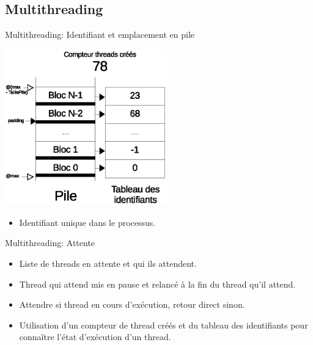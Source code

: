 \documentclass{beamer}
\begin{document}
\subsection{Multithreading}
\begin{frame}{Multithreading: Identifiant et emplacement en pile}
	\begin{center}
    	\includegraphics[width=7cm]{../rapport/schema_threads_id.eps}
	\end{center}
   \begin{itemize}
       \item Identifiant unique dans le processus.
   \end{itemize}
\end{frame}

\begin{frame}{Multithreading: Attente}
   \begin{itemize}
       \item Liste de threads en attente et qui ils attendent.
		\item Thread qui attend mis en pause et relancé à la fin du thread qu'il attend.
       \item Attendre si thread en cours d'exécution, retour direct sinon.
       \item Utilisation d'un compteur de thread créés et du tableau des identifiants pour connaître l'état d'exécution d'un thread.
   \end{itemize}
\end{frame}
\end{document}
